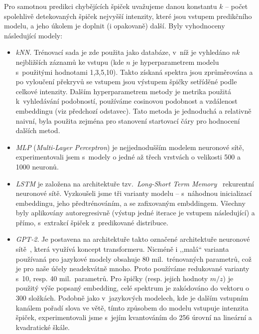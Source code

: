\documentclass[a4paper,11pt]{article}
\begin{document}
Pro samotnou predikci chybějících špiček 
uvažujeme danou konstantu $k$ -- počet spolehlivě detekovaných špiček nejvyšší intenzity,
které jsou vstupem predikčního modelu, a jeho úkolem je doplnit (i opakovaně) další. 
Byly vyhodnoceny následující modely:
\begin{itemize}
\item \emph{kNN.} Trénovací sada je zde použita jako databáze, v~níž je vyhledáno $nk$ nejbližších 
záznamů ke vstupu (kde $n$ je hyperparametrem modelu s~použitými hodnotami 1,3,5,10). 
Takto získaná spektra jsou zprůměrována a po vyloučení překryvů se vstupem jsou výstupem špičky setříděné
podle celkové intenzity.
Dalším hyperparametrem metody je metrika použitá k~vyhledávání podobností, používáme cosinovou podobnost
a vzdálenost embeddingu (viz předchozí odstavec).
Tato metoda je jednoduchá a relativně naivní, byla použita zejména pro stanovení startovací čáry pro hodnocení
dalších metod.
\item \emph{MLP} (\emph{Multi-Layer Perceptron}) je nejjednodušším modelem
neuronové sítě, experimentovali jsem s~modely o jedné až třech vrstvách o
velikosti 500 a 1000 neuronů.
\item \emph{LSTM} je založena na architektuře tzv.~\emph{Long-Short Term Memory}~\cite{lstm} rekurentní neuronové sítě.
Vyzkoušeli jsme tři varianty modelu -- s~náhodnou inicializací embeddingu, jeho předtrénováním, a se zafixovaným embddingem.
Všechny byly aplikovány autoregresivně (výstup jedné iterace je vstupem následující) a přímo, s~extrakcí špiček z~predikované distribuce.

\item \emph{GPT-2.} Je postavena na architektuře takto označené architektuře neuronové sítě~\cite{gpt2},
která využívá koncept transformeru.
Nicméně i ,,malá`` varianta používaná pro jazykové modely obsahuje 80 mil.\ trénovaných parametrů,
což je pro naše účely neadekvátně mnoho. Proto používáme redukované varianty s~10, resp. 40 mil.\ parametrů.
Pro špičky (resp. jejich hodnoty $m/z$) je použitý výše popsaný embedding, celé spektrum je zakódováno do vektoru
o 300 složkách.
Podobně jako v~jazykových modelech, kde je dalším vstupním kanálem pořadí slova ve větě,
tímto způsobem do modelu vstupuje intenzita špiček, experimentovali jsme s~jejím kvantováním do 256 úrovní
na lineární a kvadratické škále.


\end{itemize}
\end{document}
